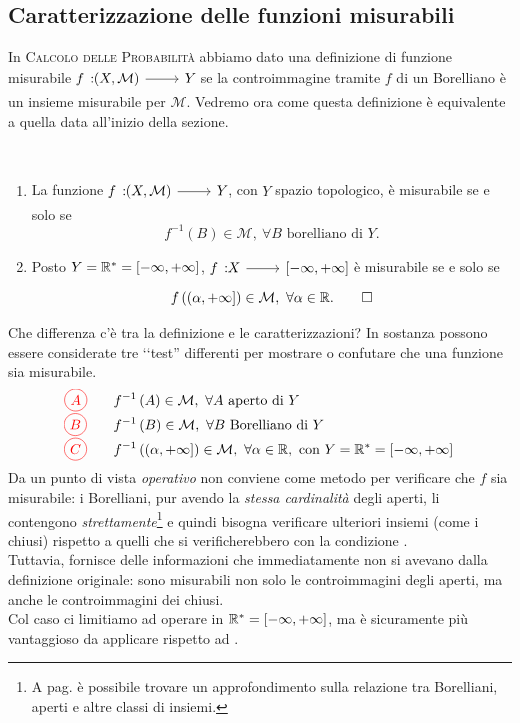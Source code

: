 \subsection{Caratterizzazione delle funzioni misurabili}
In \textsc{Calcolo delle Probabilità} abbiamo dato una definizione di funzione misurabile $\funz{f}{\left(X,\mathcal{M}\right)}{Y}$ se la controimmagine tramite $f$ di un Borelliano è un insieme misurabile per $\mathcal{M}$. Vedremo ora come questa definizione è equivalente a quella data all'inizio della sezione.
\begin{theoremasqed}~
	\begin{enumerate}\label{caratterizzazionefunzionimisurabili}
		\item La funzione $\funz{f}{\left(X,\mathcal{M}\right)}{Y}$, con $Y$ spazio topologico, è  misurabile se e solo se
		\begin{equation}
			f^{-1}\left(B\right)\in\mathcal{M},\ \forall B \text{ borelliano di } Y.
		\end{equation}
		\item Posto $Y=\mathbb{R}^{\ast}=\left[-\infty,+\infty\right]$, $\funz{f}{X}{\left[-\infty,+\infty\right]}$ è misurabile se e solo se
		\begin{equation}
			f\left(\left(\alpha,+\infty\right]\right)\in\mathcal{M},\ \forall \alpha\in\realset.\qedhere
		\end{equation}
	\end{enumerate}
\end{theoremasqed}
Che differenza c'è tra la definizione e le caratterizzazioni? In sostanza possono essere considerate tre ‘‘test'' differenti per mostrare o confutare che una funzione sia misurabile.
\begin{align*}
	\circled[red]{A}&\qquad f^{-1}\left(A\right)\in\mathcal{M},\ \forall A\text{ aperto di }Y\\
	\circled[red]{B}&\qquad f^{-1}\left(B\right)\in\mathcal{M},\ \forall B\text{ Borelliano di }Y\\
	\circled[red]{C}&\qquad f^{-1}\left(\left(\alpha,+\infty\right]\right)\in\mathcal{M},\ \forall \alpha\in\realset,\ \text{con }Y=\realset^{\ast}=\left[-\infty,+\infty\right]
\end{align*}
Da un punto di vista \textit{operativo}  non conviene come metodo per verificare che $f$ sia misurabile: i Borelliani, pur avendo la \textit{stessa cardinalità} degli aperti, li contengono \textit{strettamente}\footnote{A pag. \pageref{famigliediinsiemi} è possibile trovare un approfondimento sulla relazione tra Borelliani, aperti e altre classi di insiemi.} e quindi bisogna verificare ulteriori insiemi (come i chiusi) rispetto a quelli che si verificherebbero con la condizione .\\
Tuttavia,  fornisce delle informazioni che immediatamente non si avevano dalla definizione originale: sono misurabili non solo le controimmagini degli aperti, ma anche le controimmagini dei chiusi.\\
Col caso  ci limitiamo ad operare in $\mathbb{R}^{\ast}=\left[-\infty,+\infty\right]$, ma è sicuramente più vantaggioso da applicare rispetto ad .

